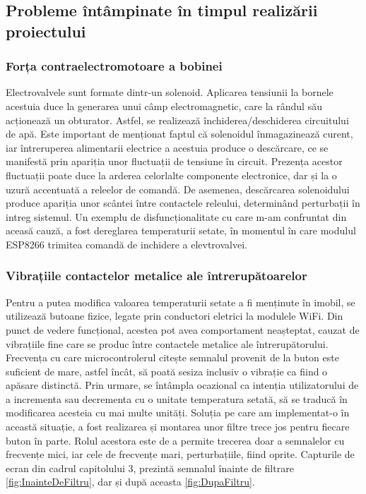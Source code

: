 \subsection{Probleme întâmpinate în timpul realizării proiectului}

\subsubsection{Forța contraelectromotoare a bobinei}

	Electrovalvele sunt formate dintr-un solenoid. Aplicarea tensiunii la bornele acestuia duce la generarea unui câmp electromagnetic, care la rândul său acționează un obturator. Astfel, se realizează închiderea/deschiderea circuitului de apă. Este important de menționat faptul că solenoidul înmagazinează curent, iar întreruperea alimentarii electrice a acestuia produce o descărcare, ce se manifestă prin apariția unor fluctuații de tensiune în circuit. Prezența acestor fluctuații poate duce la arderea celorlalte componente electronice, dar și la o uzură accentuată a releelor de comandă. De asemenea, descărcarea solenoidului produce apariția unor scântei între contactele releului, determinând perturbații în intreg sistemul. Un exemplu de disfuncționalitate cu care m-am confruntat din aceasă cauză, a fost dereglarea temperaturii setate, în momentul în care modulul ESP8266 trimitea comandă de inchidere a elevtrovalvei.   

\subsubsection{Vibrațiile contactelor metalice ale întrerupătoarelor}

	Pentru a putea modifica valoarea temperaturii setate a fi menținute în imobil, se utilizează butoane fizice, legate prin conductori eletrici la modulele WiFi. Din punct de vedere funcțional, acestea pot avea comportament neașteptat, cauzat de vibrațiile fine care se produc între contactele metalice ale întrerupătorului. Frecvența cu care microcontrolerul citește semnalul provenit de la buton este suficient de mare, astfel încât, să poată sesiza inclusiv o vibrație ca fiind o apăsare distinctă. Prin urmare, se întâmpla ocazional ca intenția utilizatorului de a incrementa sau decrementa cu o unitate temperatura setată, să se traducă în modificarea acesteia cu mai multe unități. Soluția pe care am implementat-o în această situație, a fost realizarea și montarea unor filtre trece jos pentru fiecare buton în parte. Rolul acestora este de a permite trecerea doar a semnalelor cu frecvențe mici, iar cele de frecvențe mari, perturbațiile, fiind oprite. Capturile de ecran din cadrul capitolului 3, prezintă semnalul înainte de filtrare \ref{fig:InainteDeFiltru}, dar și după aceasta \ref{fig:DupaFiltru}.

